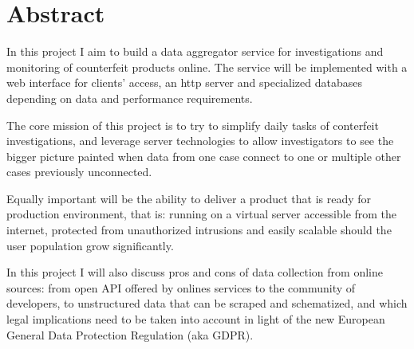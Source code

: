 \chapter{Abstract}
In this project I aim to build a data aggregator service for
investigations and monitoring of counterfeit products online. The
service will be implemented with a web interface for clients' access, an http
server and specialized databases depending on data and performance
requirements.

The core mission of this project is to try to simplify daily tasks of conterfeit
investigations, and leverage server technologies to allow investigators to see
the bigger picture painted when data from one case connect to one or multiple
other cases previously unconnected.

Equally important will be the ability to deliver a product that is ready for
production environment, that is: running on a virtual server accessible from the
internet, protected from unauthorized intrusions and easily scalable should the
user population grow significantly.

In this project I will also discuss pros and cons of data collection from online
sources: from open API offered by onlines services to the community of
developers, to unstructured data that can be scraped and schematized, and which
legal implications need to be taken into account in light of the new European
General Data Protection Regulation (aka GDPR).
